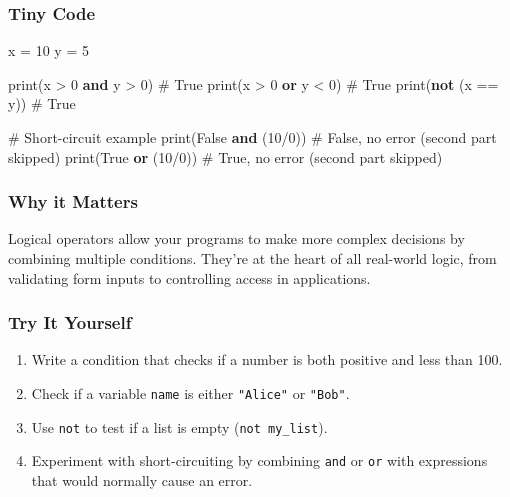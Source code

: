 \documentclass[
  letterpaper,
  DIV=11,
  numbers=noendperiod]{scrreprt}
\newenvironment{Shaded}{\begin{snugshade}}{\end{snugshade}}
\newcommand{\BuiltInTok}[1]{\textcolor[rgb]{0.00,0.23,0.31}{#1}}
\newcommand{\CommentTok}[1]{\textcolor[rgb]{0.37,0.37,0.37}{#1}}
\newcommand{\DecValTok}[1]{\textcolor[rgb]{0.68,0.00,0.00}{#1}}
\newcommand{\KeywordTok}[1]{\textcolor[rgb]{0.00,0.23,0.31}{\textbf{#1}}}
\newcommand{\NormalTok}[1]{\textcolor[rgb]{0.00,0.23,0.31}{#1}}
\newcommand{\OperatorTok}[1]{\textcolor[rgb]{0.37,0.37,0.37}{#1}}
\newcommand{\VariableTok}[1]{\textcolor[rgb]{0.07,0.07,0.07}{#1}}
\providecommand{\tightlist}{%
  \setlength{\itemsep}{0pt}\setlength{\parskip}{0pt}}
\begin{document}
\subsubsection{Tiny Code}\label{tiny-code-12}

\begin{Shaded}
\begin{Highlighting}[]
\NormalTok{x }\OperatorTok{=} \DecValTok{10}
\NormalTok{y }\OperatorTok{=} \DecValTok{5}

\BuiltInTok{print}\NormalTok{(x }\OperatorTok{\textgreater{}} \DecValTok{0} \KeywordTok{and}\NormalTok{ y }\OperatorTok{\textgreater{}} \DecValTok{0}\NormalTok{)   }\CommentTok{\# True}
\BuiltInTok{print}\NormalTok{(x }\OperatorTok{\textgreater{}} \DecValTok{0} \KeywordTok{or}\NormalTok{ y }\OperatorTok{\textless{}} \DecValTok{0}\NormalTok{)    }\CommentTok{\# True}
\BuiltInTok{print}\NormalTok{(}\KeywordTok{not}\NormalTok{ (x }\OperatorTok{==}\NormalTok{ y))      }\CommentTok{\# True}

\CommentTok{\# Short{-}circuit example}
\BuiltInTok{print}\NormalTok{(}\VariableTok{False} \KeywordTok{and}\NormalTok{ (}\DecValTok{10}\OperatorTok{/}\DecValTok{0}\NormalTok{))  }\CommentTok{\# False, no error (second part skipped)}
\BuiltInTok{print}\NormalTok{(}\VariableTok{True} \KeywordTok{or}\NormalTok{ (}\DecValTok{10}\OperatorTok{/}\DecValTok{0}\NormalTok{))    }\CommentTok{\# True, no error (second part skipped)}
\end{Highlighting}
\end{Shaded}

\subsubsection{Why it Matters}\label{why-it-matters-12}

Logical operators allow your programs to make more complex decisions by
combining multiple conditions. They're at the heart of all real-world
logic, from validating form inputs to controlling access in
applications.

\subsubsection{Try It Yourself}\label{try-it-yourself-12}

\begin{enumerate}
\def\labelenumi{\arabic{enumi}.}
\tightlist
\item
  Write a condition that checks if a number is both positive and less
  than 100.
\item
  Check if a variable \texttt{name} is either \texttt{"Alice"} or
  \texttt{"Bob"}.
\item
  Use \texttt{not} to test if a list is empty (\texttt{not\ my\_list}).
\item
  Experiment with short-circuiting by combining \texttt{and} or
  \texttt{or} with expressions that would normally cause an error.
\end{enumerate}
\end{document}
